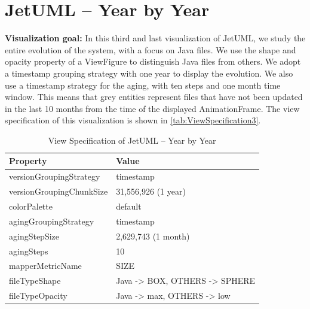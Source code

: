 \section{JetUML – Year by Year}
\noindent
\textbf{Visualization goal:}
In this third and last visualization of JetUML, we study the entire evolution of the system, with a focus on Java files. 
We use the shape and opacity property of a ViewFigure to distinguish Java files from others.
We adopt a timestamp grouping strategy with one year to display the evolution. We also use a timestamp strategy for the aging, with ten steps and one month time window. This means that grey entities represent files that have not been updated in the last 10 months from the time of the displayed AnimationFrame. 
The view specification of this visualization is shown in \autoref{tab:ViewSpecification3}.
\begin{table}[h]
	\small
    \centering
    \begin{tabular}{@{}ll@{}} 
        \toprule
        \textbf{Property} & \textbf{Value} \\\midrule
        versionGroupingStrategy & timestamp\\ 
		versionGroupingChunkSize & 31,556,926 (1 year)\\
		colorPalette & default\\
		agingGroupingStrategy & timestamp \\
		agingStepSize & 2,629,743 (1 month) \\
		agingSteps & 10 \\
		mapperMetricName & SIZE \\
		fileTypeShape & Java -> BOX, OTHERS -> SPHERE \\
		fileTypeOpacity & Java -> max, OTHERS -> low \\\bottomrule
    \end{tabular}
    \caption{View Specification of JetUML – Year by Year}
    \label{tab:ViewSpecification3}
\end{table}

